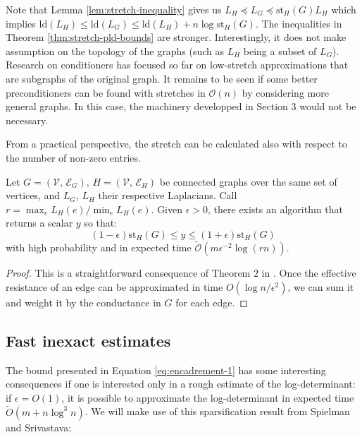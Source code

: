 Note that Lemma \ref{lem:stretch-inequality} gives us $L_{H}\preceq L_{G}\preceq\text{st}_{H}\left(G\right)L_{H}$
which implies $\text{ld}\left(L_{H}\right)\leq\text{ld}\left(L_{G}\right)\leq\text{ld}\left(L_{H}\right)+n\log\text{st}_{H}\left(G\right)$.
The inequalities in Theorem \ref{thm:stretch-pld-bounds} are stronger.
Interestingly, it does not make assumption on the topology of the
graphs (such as $L_{H}$ being a subset of $L_{G}$). Research on
conditioners has focused so far on low-stretch approximations that
are subgraphs of the original graph. It remains to be seen if some
better preconditioners can be found with stretches in $\mathcal{O}\left(n\right)$
by considering more general graphs. In this case, the machinery developped
in Section 3 would not be necessary.

From a practical perspective, the stretch can be calculated also with
respect to the number of non-zero entries.

\begin{lemma}\label{lem:stretch-approx}Let $G=\left(\mathcal{V},\,\mathcal{E}_{G}\right),\, H=\left(\mathcal{V},\,\mathcal{E}_{H}\right)$
be connected graphs over the same set of vertices, and $L_{G}$, $L_{H}$
their respective Laplacians. Call $r=\max_{e}L_{H}\left(e\right)/\min_{e}L_{H}\left(e\right)$.
Given $\epsilon>0$, there exists an algorithm that returns a scalar
$y$ so that: 
\[
\left(1-\epsilon\right)\text{st}_{H}\left(G\right)\leq y\leq\left(1+\epsilon\right)\text{st}_{H}\left(G\right)
\]
with high probability and in expected time $\tilde{\mathcal{O}}\left(m\epsilon^{-2}\log\left(rn\right)\right)$.

\end{lemma}

\begin{proof}This is a straightforward consequence of Theorem $2$
in \cite{Spielman2009}. Once the effective resistance of an edge
can be approximated in time $O\left(\log n/\epsilon^{2}\right)$,
we can sum it and weight it by the conductance in $G$ for each edge.

\end{proof}


\subsection{Fast inexact estimates}

The bound presented in Equation \ref{eq:encadrement-1} has some interesting
consequences if one is interested only in a rough estimate of the
log-determinant: if $\epsilon=O\left(1\right)$, it is possible to
approximate the log-determinant in expected time $\tilde{O}\left(m+n\log^{3}n\right)$.
We will make use of this sparsification result from Spielman and Srivastava:

